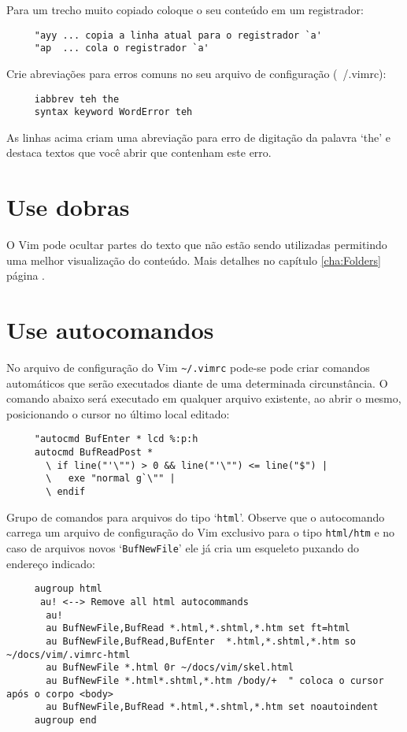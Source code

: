 Para um trecho muito copiado coloque o seu conteúdo em um registrador:

\begin{verbatim}
     "ayy ... copia a linha atual para o registrador `a'
     "ap  ... cola o registrador `a'
\end{verbatim}

Crie abreviações para erros comuns no seu arquivo de configuração (~/.vimrc):

\begin{verbatim}
     iabbrev teh the
     syntax keyword WordError teh
\end{verbatim}

As linhas acima criam uma abreviação para erro de digitação da palavra `the'
e destaca textos que você abrir que contenham este erro.

\section{Use dobras}\label{sec:Use folders}

O Vim pode ocultar partes do texto que não estão sendo utilizadas permitindo
uma melhor visualização do conteúdo. Mais detalhes no capítulo
\ref{cha:Folders} página \pageref{cha:Folders}.

\section{Use autocomandos}
\label{Use autocomandos}

No arquivo de configuração do Vim \verb|~/.vimrc| pode-se pode criar comandos
automáticos que serão executados diante de uma determinada circunstância. 
O comando abaixo será executado em qualquer arquivo existente, ao abrir o mesmo, 
posicionando o cursor no último local editado:

\begin{verbatim}
     "autocmd BufEnter * lcd %:p:h
     autocmd BufReadPost *
       \ if line("'\"") > 0 && line("'\"") <= line("$") |
       \   exe "normal g`\"" |
       \ endif
\end{verbatim}


Grupo de comandos para arquivos do tipo `{\tt html}'. Observe que o autocomando
carrega um arquivo de configuração do Vim exclusivo para o tipo {\tt html/htm}
e no caso de arquivos novos `{\tt BufNewFile}' ele já cria um esqueleto puxando
do endereço indicado:

\begin{verbatim}
     augroup html
      au! <--> Remove all html autocommands
       au!
       au BufNewFile,BufRead *.html,*.shtml,*.htm set ft=html
       au BufNewFile,BufRead,BufEnter  *.html,*.shtml,*.htm so ~/docs/vim/.vimrc-html
       au BufNewFile *.html 0r ~/docs/vim/skel.html
       au BufNewFile *.html*.shtml,*.htm /body/+  " coloca o cursor após o corpo <body>
       au BufNewFile,BufRead *.html,*.shtml,*.htm set noautoindent
     augroup end
\end{verbatim}

